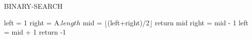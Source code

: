\documentclass{article}
\begin{document}
\begin{algorithm}
	\caption{BINARY-SEARCH}
	\begin{algorithmic}[1]
		\State left = 1
		\State right = A.$length$
		 
		  \State mid = $\lfloor$(left+right)/2$\rfloor$
		    \State return mid
		    \State right = mid - 1
		  \Else
		    \State left = mid + 1
		  \EndIf
		\EndWhile
		\State return -1 
		\EndFunction
		
	\end{algorithmic}
\end{algorithm}
\end{document}
